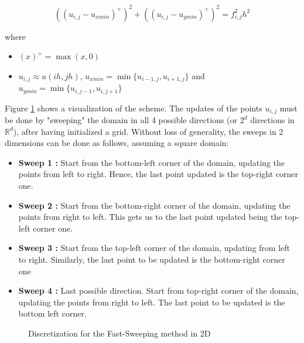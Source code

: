 \documentclass[11pt]{article}
\theoremstyle{definition}
\theoremstyle{remark}
\begin{document}
\begin{equation*}
    ((u_{i,j}-u_{xmin})^{+})^2+((u_{i,j}-u_{ymin})^{+})^2 = f_{i,j}^{2}h^2
\end{equation*}

\noindent where
\begin{itemize}
    \item $(x)^{+} = \max(x,0)$
    \item $u_{i,j}\approx u(ih,jh)$, $u_{xmin} = \min\{u_{i-1,j},u_{i+1,j}\}$ and $u_{ymin} = \min\{u_{i,j-1},u_{i,j+1}\}$
\end{itemize}

\noindent Figure \ref{fig:graph_discretization} shows a visualization of the scheme. The updates of the points $u_{i,j}$ must be done by "sweeping" the domain in all 4 possible directions (or $2^d$ directions in $\mathbb{R}^d$), after having initialized a grid. Without loss of generality, the sweeps in 2 dimensions can be done as follows, assuming a square domain:
\begin{itemize}
    \item \textbf{Sweep 1 : } Start from the bottom-left corner of the domain, updating the points from left to right. Hence, the last point updated is the top-right corner one.
    \item \textbf{Sweep 2 : } Start from the bottom-right corner of the domain, updating the points from right to left. This gets us to the last point updated being the top-left corner one.
    \item  \textbf{Sweep 3 : } Start from the top-left corner of the domain, updating from left to right. Similarly, the last point to be updated is the bottom-right corner one
    \item \textbf{Sweep 4 : } Last possible direction. Start from top-right corner of the domain, updating the points from right to left. The last point to be updated is the bottom left corner.
\end{itemize}

\begin{figure}[h!]
    \centering
    \caption{Discretization for the Fast-Sweeping method in 2D}
    \label{fig:graph_discretization}
\end{figure}
\end{document}
